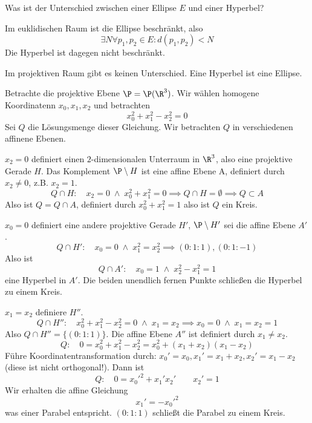 \documentclass{mycourse}
\begin{document}
\begin{ex}[Quadriken]
	Was ist der Unterschied zwischen einer Ellipse $E$ und einer Hyperbel?

	Im euklidischen Raum ist die Ellipse beschränkt, also
	\[
		\exists N \forall p_1,p_2 \in E : d(p_1,p_2) < N
	\]
	Die Hyperbel ist dagegen nicht beschränkt.

	Im projektiven Raum gibt es keinen Unterschied.
	Eine Hyperbel ist eine Ellipse.

	Betrachte die projektive Ebene $\P = \P(\R^3)$.
	Wir wählen homogene Koordinatenn $x_0,x_1,x_2$ und betrachten
	\[
		x_0^2 + x_1^2 - x_2^2 = 0
	\]
	Sei $Q$ die Lösungsmenge dieser Gleichung.
	Wir betrachten $Q$ in verschiedenen affinene Ebenen.
	\begin{seg}[$x_2=0$]
		$x_2=0$ definiert einen $2$-dimensionalen Unterraum in $\R^3$, also eine projektive Gerade $H$.
		Das Komplement $\P\setminus H$ ist eine affine Ebene A, definiert durch $x_2 \neq 0$, z.B. $x_2=1$.
		\[
			Q \cap H : \quad x_2 = 0 \;\land\; x_0^2+x_1^2 = 0 \implies Q \cap H = \emptyset \implies Q \subset A
		\]
		Also ist $Q = Q \cap A$, definiert durch $x_0^2 + x_1^2 = 1$ also ist $Q$ ein Kreis.
	\end{seg}
	\begin{seg}[$x_0=0$ (oder $x_1=0$)]
		$x_0=0$ definiert eine andere projektive Gerade $H'$, $\P\setminus H'$ sei die affine Ebene $A'$.
		\[
			Q \cap H': \quad x_0 = 0 \;\land\; x_1^2 = x_2^2 \implies (0:1:1), (0:1:-1)
		\]
		Also ist
		\[
			Q \cap A' : \quad x_0=1 \;\land\; x_2^2-x_1^2=1
		\]
		eine Hyperbel in $A'$.
		Die beiden unendlich fernen Punkte schließen die Hyperbel zu einem Kreis.
	\end{seg}
	\begin{seg}[$x_1=x_2$]
		$x_1=x_2$ definiere $H''$.
		\[
			Q \cap H'' : \quad x_0^2 + x_1^2 - x_2^2 = 0 \;\land\; x_1=x_2 \implies  x_0=0 \;\land\; x_1=x_2=1
		\]
		Also $Q\cap H'' = \{(0:1:1)\}$.
		Die affine Ebene $A''$ ist definiert durch $x_1\neq x_2$.
		\[
			Q: \quad 0 = x_0^2 + x_1^2 -x_2^2 = x_0^2 + (x_1+x_2)(x_1-x_2)
		\]
		Führe Koordinatentransformation durch: $x_0' = x_0, x_1'=x_1+x_2, x_2'=x_1-x_2$ (diese ist nicht orthogonal!).
		Dann ist
		\[
			Q: \quad 0 =x_0'^2 + x_1'x_2' \qquad x_2'=1
		\]
		Wir erhalten die affine Gleichung
		\[
			x_1' = -x_0'^2
		\]
		was einer Parabel entspricht.
		$(0:1:1)$ schließt die Parabel zu einem Kreis.
	\end{seg}
\end{ex}
\end{document}
